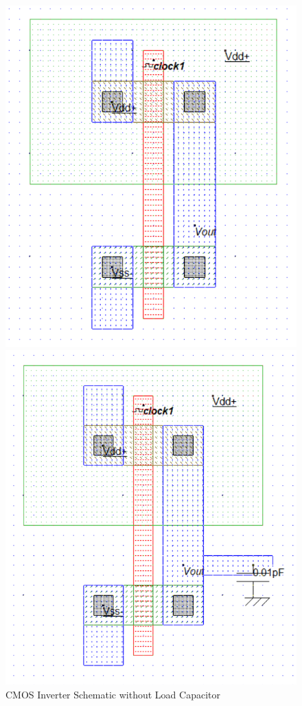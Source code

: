 \documentclass[12pt]{article}
\begin{document}
\begin{figure}[H]
    \centering
    \begin{minipage}{0.48\textwidth}
        \centering
        \includegraphics[width=\textwidth]{1inv.png}
        \caption{CMOS Inverter Schematic without Load Capacitor}
    \end{minipage}\hfill
    \begin{minipage}{0.48\textwidth}
        \centering
        \includegraphics[width=\textwidth]{1cap_inv.png}

\end{minipage}
\end{figure}
\end{document}
